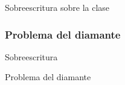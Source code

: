 \documentclass[10pt,envcountsect,spanish]{beamer}
\begin{document}
\begin{frame}[fragile]{Sobreescritura  sobre la clase }
\begin{itemize}
%
%

\end{itemize}

\end{frame}







\subsubsection{Problema del diamante}



\begin{frame}

\hfil\hfil\begin{minipage}{.4\textwidth}
\begin{alertblock}{Sobreescritura}
\centerline{Problema del diamante}
\end{alertblock}
\end{minipage}
\end{frame}
\end{document}
